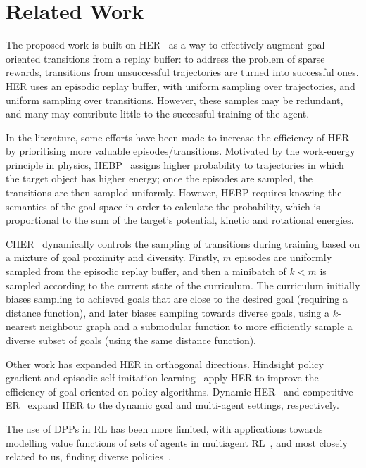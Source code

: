 \section{Related Work}
The proposed work is built on HER~\cite{andrychowicz2017hindsight} as a way to effectively augment goal-oriented transitions from a replay buffer: to address the problem of sparse rewards, transitions from unsuccessful trajectories are turned into successful ones. HER uses an episodic replay buffer, with uniform sampling over trajectories, and uniform sampling over transitions. However, these samples may be redundant, and many may contribute little to the successful training of the agent.

In the literature, some efforts have been made to increase the efficiency of HER by prioritising more valuable episodes/transitions. Motivated by the work-energy principle in physics, HEBP~\cite{zhao2018energy} assigns higher probability to trajectories in which the target object has higher energy; once the episodes are sampled, the transitions are then sampled uniformly. However, HEBP requires knowing the semantics of the goal space in order to calculate the probability, which is proportional to the sum of the target's potential, kinetic and rotational energies.

CHER~\cite{fang2019curriculum} dynamically controls the sampling of transitions during training based on a mixture of goal proximity and diversity. Firstly, $m$ episodes are uniformly sampled from the episodic replay buffer, and then a minibatch of $k < m$ is sampled according to the current state of the curriculum. The curriculum initially biases sampling to achieved goals that are close to the desired goal (requiring a distance function), and later biases sampling towards diverse goals, using a $k$-nearest neighbour graph and a submodular function to more efficiently sample a diverse subset of goals (using the same distance function).

Other work has expanded HER in orthogonal directions. Hindsight policy gradient \cite{rauber2018hindsight} and episodic self-imitation learning~\cite{dai2020episodic} apply HER to improve the efficiency of goal-oriented on-policy algorithms. Dynamic HER~\cite{fang2018dher} and competitive ER~\cite{liu2018competitive} expand HER to the dynamic goal and multi-agent settings, respectively.

The use of DPPs in RL has been more limited, with applications towards modelling value functions of sets of agents in multiagent RL~\cite{osogami2019determinantal,pmlr-v119-yang20i}, and most closely related to us, finding diverse policies~\cite{parker2020effective}.

